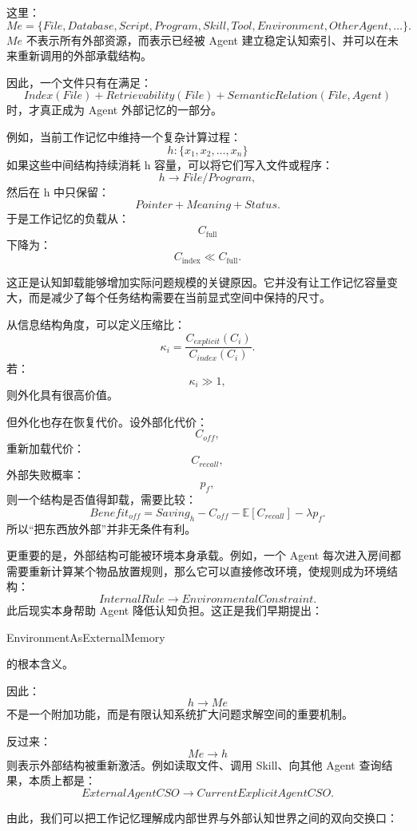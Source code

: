 这里：
\[
Me
=
\{
File,
Database,
Script,
Program,
Skill,
Tool,
Environment,
OtherAgent,
\ldots
\}.
\]
$Me$ 不表示所有外部资源，而表示已经被 Agent 建立稳定认知索引、并可以在未来重新调用的外部承载结构。

因此，一个文件只有在满足：
\[
Index(File)
+
Retrievability(File)
+
SemanticRelation(File,Agent)
\]
时，才真正成为 Agent 外部记忆的一部分。

例如，当前工作记忆中维持一个复杂计算过程：
\[
h:
\{x_1,x_2,\dots,x_n\}
\]
如果这些中间结构持续消耗 h 容量，可以将它们写入文件或程序：
\[
h
\rightarrow
File/Program,
\]
然后在 h 中只保留：
\[
Pointer+
Meaning+
Status.
\]
于是工作记忆的负载从：
\[
C_{\mathrm{full}}
\]
下降为：
\[
C_{\mathrm{index}}
\ll
C_{\mathrm{full}}.
\]

这正是认知卸载能够增加实际问题规模的关键原因。它并没有让工作记忆容量变大，而是减少了每个任务结构需要在当前显式空间中保持的尺寸。

从信息结构角度，可以定义压缩比：
\[
\kappa_i
=
\frac{C_{explicit}(C_i)}
{C_{index}(C_i)}.
\]
若：
\[
\kappa_i\gg1,
\]
则外化具有很高价值。

但外化也存在恢复代价。设外部化代价：
\[
C_{off},
\]
重新加载代价：
\[
C_{recall},
\]
外部失败概率：
\[
p_f,
\]
则一个结构是否值得卸载，需要比较：
\[
Benefit_{off}
=
Saving_h
-
C_{off}
-
\mathbb E[C_{recall}]
-
\lambda p_f.
\]
所以“把东西放外部”并非无条件有利。

更重要的是，外部结构可能被环境本身承载。例如，一个 Agent 每次进入房间都需要重新计算某个物品放置规则，那么它可以直接修改环境，使规则成为环境结构：
\[
InternalRule
\rightarrow
EnvironmentalConstraint.
\]
此后现实本身帮助 Agent 降低认知负担。这正是我们早期提出：
\begin{statementbox}
EnvironmentAsExternalMemory
\end{statementbox}
的根本含义。

因此：
\[
h\rightarrow Me
\]
不是一个附加功能，而是有限认知系统扩大问题求解空间的重要机制。

反过来：
\[
Me\rightarrow h
\]
则表示外部结构被重新激活。例如读取文件、调用 Skill、向其他 Agent 查询结果，本质上都是：
\[
ExternalAgentCSO
\rightarrow
CurrentExplicitAgentCSO.
\]

由此，我们可以把工作记忆理解成内部世界与外部认知世界之间的双向交换口：
\begin{statementbox}
\centering
{}
\end{statementbox}

